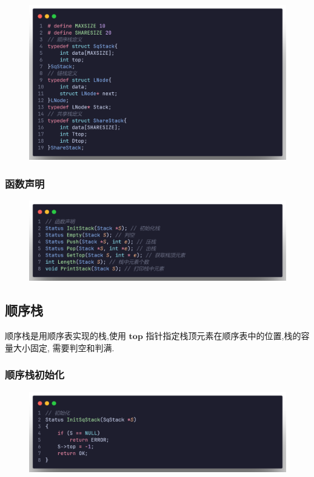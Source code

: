 \begin{figure}[H]
    \centering
    \includegraphics[scale=0.2]{"figure/Note/Stack/SDefine.png"}
\end{figure}

\subsubsection{函数声明}

\begin{figure}[H]
    \centering
    \includegraphics[scale=0.2]{"figure/Note/Stack/SFunction.png"}
\end{figure}

\subsection{顺序栈}
\begin{definition}[顺序栈]
    顺序栈是用顺序表实现的栈,使用 $\mathbf{top}$ 指针指定栈顶元素在顺序表中的位置,栈的容量大小固定, 需要判空和判满.
\end{definition}

\subsubsection{顺序栈初始化}

\begin{figure}[H]
    \centering
    \includegraphics[scale=0.2]{"figure/Note/Stack/SqInit.png"}
\end{figure}

